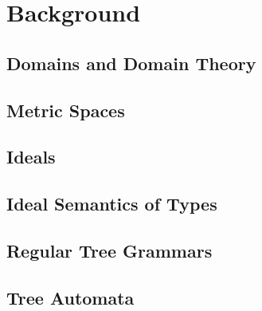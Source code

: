 
\chapter{Background}



\section{Domains and Domain Theory}

\section{Metric Spaces}

\section{Ideals}

\section{Ideal Semantics of Types}


\section{Regular Tree Grammars}

\section{Tree Automata}
